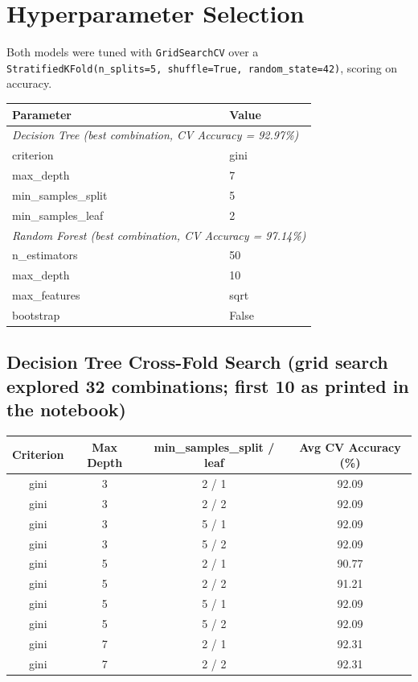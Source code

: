 \documentclass[12pt,a4paper]{article}
\begin{document}
\section{Hyperparameter Selection}

Both models were tuned with \texttt{GridSearchCV} over a \texttt{StratifiedKFold(n\_splits=5, shuffle=True, random\_state=42)}, scoring on accuracy.
 
\begin{tabular}{ll}
\toprule
Parameter & Value \\
\midrule
\multicolumn{2}{l}{\textit{Decision Tree (best combination, CV Accuracy = 92.97\%)}} \\
criterion & gini \\
max\_depth & 7 \\
min\_samples\_split & 5 \\
min\_samples\_leaf & 2 \\
\midrule
\multicolumn{2}{l}{\textit{Random Forest (best combination, CV Accuracy = 97.14\%)}} \\
n\_estimators & 50 \\
max\_depth & 10 \\
max\_features & sqrt \\
bootstrap & False \\
\bottomrule
\end{tabular}
 
\subsection*{Decision Tree Cross-Fold Search (grid search explored 32 combinations; first 10 as printed in the notebook)}
\begin{longtable}{cccc}
\toprule
Criterion & Max Depth & min\_samples\_split / leaf & Avg CV Accuracy (\%) \\
\midrule
gini & 3 & 2 / 1 & 92.09 \\
gini & 3 & 2 / 2 & 92.09 \\
gini & 3 & 5 / 1 & 92.09 \\
gini & 3 & 5 / 2 & 92.09 \\
gini & 5 & 2 / 1 & 90.77 \\
gini & 5 & 2 / 2 & 91.21 \\
gini & 5 & 5 / 1 & 92.09 \\
gini & 5 & 5 / 2 & 92.09 \\
gini & 7 & 2 / 1 & 92.31 \\
gini & 7 & 2 / 2 & 92.31 \\
\bottomrule
\end{longtable}
 
\end{document}
